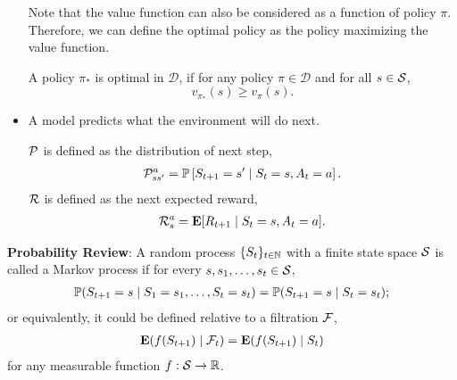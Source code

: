 \begin{itemize}
\begin{remark} 
Note that the value function can also be considered as a function of policy $\pi$. Therefore, we can define the optimal policy as the policy maximizing the value function.
\end{remark} 
\begin{comment}
\begin{remark} Let $V$ be the space of all value functions (with the same domain); here we take state-value functions as an example. There is a natural partial order on $V$:
\begin{align*}
v(s) \leq v'(s) \iff v(s) \leq v'(s) \text{ for all } s\in \calS.
\end{align*}
\begin{enumerate}[(1)]
\item 
Sometimes we use $\sup_\pi$ instead of $\max_\pi$ in the definition of optimal value function; because  

\item 
Note that the value function can also be considered as a function of policy $\pi$. Therefore, we can define the optimal policy as the policy maximizing the value function.
\end{enumerate}
\end{remark}
\end{comment}
	\begin{definition}
		A policy $\pi_\ast$ is optimal in $\mathcal{D}$, if for any policy $\pi\in \mathcal{D}$ and for all $s\in \mathcal{S}$,
		$$v_{\pi_\ast}(s) \geq v_\pi(s).$$ 
	\end{definition} 
	
	\item A model predicts what the environment will do next.
	\begin{definition}[Model]
		$\mathcal{P}$ is defined as the distribution of next step,
		\begin{align*}
		\mathcal{P}^a_{ss'} = \mathbb{P}\left[ S_{t+1} = s' \mid S_t = s, A_t = a \right].
		\end{align*}
		$\mathcal{R}$ is defined as the next expected reward,
		\begin{align*}
		\mathcal{R}_s^a = \mathbf{E} [ R_{t+1} \mid S_t = s, A_t = a  ].
		\end{align*}
	\end{definition}
\end{itemize}  

\medspace

\textbf{Probability Review}: A random process $\{S_t\}_{t\in \mathbb{N}}$ with a finite state space $\mathcal{S}$ is called a Markov process if for every $s, s_1, \dots, s_t\in \mathcal{S}$,
\begin{align*}
 \mathbb{P}( S_{t+1} = s \mid S_1 = s_1, \dots, S_t = s_t ) = \mathbb{P}( S_{t+1} = s \mid S_t = s_t );
\end{align*} 
or equivalently, it could be defined relative to a filtration $\mathcal{F}$,
\begin{align*}
\mathbf{E}( f(S_{t+1}) \mid \mathcal{F}_t ) = \mathbf{E}( f(S_{t+1}) \mid S_t ) 
\end{align*}
for any measurable function $f:\mathcal{S} \to \mathbb{R}$. 

